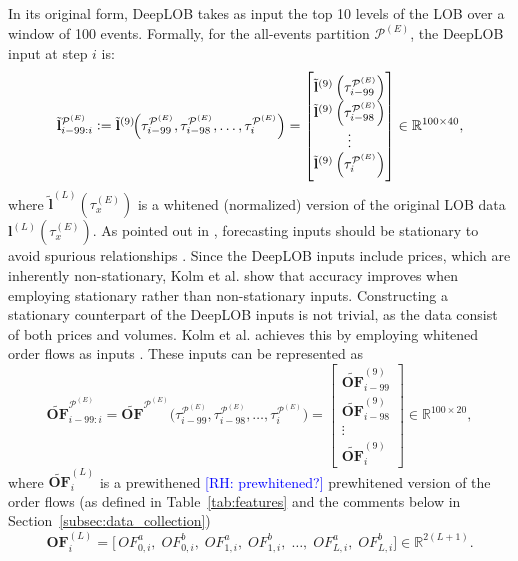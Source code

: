 \documentclass[10pt,a4paper,oneside]{article}
\newcommand{\rh}[1]{\textcolor{blue}{\textsf{[RH: #1]}}}
\providecommand{\DIFaddtex}[1]{{\protect\color{blue} \sf #1}} %
\providecommand{\DIFdeltex}[1]{{\protect\color{red} \scriptsize #1}} %
\providecommand{\DIFaddbegin}{} %
\providecommand{\DIFaddend}{} %
\providecommand{\DIFdelbegin}{} %
\providecommand{\DIFdelend}{} %
\providecommand{\DIFadd}[1]{\texorpdfstring{\DIFaddtex{#1}}{#1}} %
\providecommand{\DIFdel}[1]{\texorpdfstring{\DIFdeltex{#1}}{}} %
\newcommand{\DIFscaledelfig}{0.5}
\newlength{\DIFdelgraphicswidth} %
\newlength{\DIFdelgraphicsheight} %
\newcommand{\DIFaddincludegraphics}[2][]{{\color{blue}\fbox{\DIFOincludegraphics[#1]{#2}}}} %
\newcommand{\DIFdelincludegraphics}[2][]{%
\sbox{\DIFdelgraphicsbox}{\DIFOincludegraphics[#1]{#2}}%
\settoboxwidth{\DIFdelgraphicswidth}{\DIFdelgraphicsbox} %
\settoboxtotalheight{\DIFdelgraphicsheight}{\DIFdelgraphicsbox} %
\scalebox{\DIFscaledelfig}{%
\parbox[b]{\DIFdelgraphicswidth}{\usebox{\DIFdelgraphicsbox}\\[-\baselineskip] \rule{\DIFdelgraphicswidth}{0em}}\llap{\resizebox{\DIFdelgraphicswidth}{\DIFdelgraphicsheight}{%
\setlength{\unitlength}{\DIFdelgraphicswidth}%
\begin{picture}(1,1)%
\thicklines\linethickness{2pt} %
{\color[rgb]{1,0,0}\put(0,0){\framebox(1,1){}}}%
{\color[rgb]{1,0,0}\put(0,0){\line( 1,1){1}}}%
{\color[rgb]{1,0,0}\put(0,1){\line(1,-1){1}}}%
\end{picture}%
}\hspace*{3pt}}} %
} %
\DeclareRobustCommand{\DIFaddbegin}{\DIFOaddbegin \let\includegraphics\DIFaddincludegraphics} %
\DeclareRobustCommand{\DIFaddend}{\DIFOaddend \let\includegraphics\DIFOincludegraphics} %
\DeclareRobustCommand{\DIFdelbegin}{\DIFOdelbegin \let\includegraphics\DIFdelincludegraphics} %
\DeclareRobustCommand{\DIFdelend}{\DIFOaddend \let\includegraphics\DIFOincludegraphics} %
\begin{document}
In its original form, DeepLOB takes as input the top 10 levels of the LOB over a window of 100 events. Formally, for the all-events partition $\mathcal{P}^{(E)}$, the DeepLOB input at step $i$ is:
\[
    \tilde{\mathbf{l}}^{\mathcal{P}^{(E)}}_{i - 99 : i}
    :=
    \tilde{\mathbf{l}}^{(9)}\!\Bigl(\tau^{\mathcal{P}^{(E)}}_{i - 99}, \tau^{\mathcal{P}^{(E)}}_{i - 98}, \dots , \tau^{\mathcal{P}^{(E)}}_{i}\Bigr)
    =
    \begin{bmatrix}
        \tilde{\mathbf{l}}^{(9)}\left(\tau^{\mathcal{P}^{(E)}}_{i - 99}\right) \\
        \tilde{\mathbf{l}}^{(9)}\left(\tau^{\mathcal{P}^{(E)}}_{i - 98}\right) \\
        \vdots                                                                 \\
        \tilde{\mathbf{l}}^{(9)}\left(\tau^{\mathcal{P}^{(E)}}_{i}\right)
    \end{bmatrix}
    \in \mathbb{R}^{100 \times 40},
\]
where $\tilde{\mathbf{l}}^{(L)}(\tau^{(E)}_x)$ is a whitened (normalized) version of the original LOB data $\mathbf{l}^{(L)}(\tau^{(E)}_x)$. As pointed out in \cite{kolm2023deep}, forecasting inputs should be stationary to avoid spurious relationships \cite{granger1974spurious, phillips1986understanding}. Since the DeepLOB inputs include prices, which are inherently non-stationary, Kolm et al. \cite{kolm2023deep} show that accuracy improves when employing stationary rather than non-stationary inputs. Constructing a stationary counterpart of the DeepLOB inputs is not trivial, as the data consist of both prices and volumes. Kolm et al. \cite{kolm2023deep} achieves this by employing whitened order flows as inputs \cite{cont2013price, cont2023cross}. These inputs can be represented as
\[
    \widetilde{\mathbf{OF}}^{\mathcal{P}^{(E)}}_{i - 99:i}
    =
    \widetilde{\mathbf{OF}}^{\mathcal{P}^{(E)}}\!\bigl(\tau^{\mathcal{P}^{(E)}}_{i - 99}, \tau^{\mathcal{P}^{(E)}}_{i - 98}, \dots , \tau^{\mathcal{P}^{(E)}}_{i}\bigr)
    =
    \begin{bmatrix}
        \widetilde{\mathbf{OF}}^{(9)}_{i - 99} \\
        \widetilde{\mathbf{OF}}^{(9)}_{i - 98} \\
        \vdots                                 \\
        \widetilde{\mathbf{OF}}^{(9)}_i
    \end{bmatrix}
    \in \mathbb{R}^{100 \times 20},
\]
where $\widetilde{\mathbf{OF}}^{(L)}_i$ is a \DIFdelbegin \DIFdel{prewithened \rh{prewhitened?} }\DIFdelend \DIFaddbegin \DIFadd{prewhitened }\DIFaddend version of the order flows (as defined in Table~\ref{tab:features} and the comments below in Section~\ref{subsec:data_collection})
\[
    \mathbf{OF}^{(L)}_i
    =
    \bigl[\,OF^a_{0, i},\;
        OF^b_{0, i},\; OF^a_{1, i},\; OF^b_{1, i},\; \dots,\; OF^a_{L, i},\; OF^b_{L, i}\bigr]
    \in \mathbb{R}^{2(L + 1)}.
\]
\end{document}
